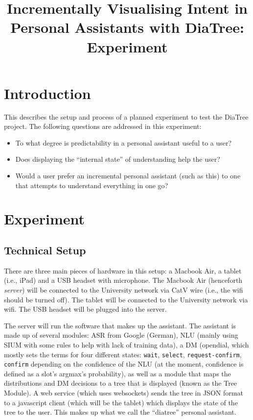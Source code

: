 \documentclass[a4paper,10pt]{article}
\title{Incrementally Visualising Intent in Personal Assistants with DiaTree: Experiment}
\author{}
\begin{document}
\maketitle

\begin{abstract}

\end{abstract}

\section{Introduction}

This describes the setup and process of a planned experiment to test the DiaTree project. The following questions are addressed in this experiment:

\begin{itemize}
 \item To what degree is predictability in a personal assistant useful to a user?
 \item Does displaying the ``internal state'' of understanding help the user?
 \item Would a user prefer an incremental personal assistant (such as this) to one that attempts to understand everything in one go?
\end{itemize}


\section{Experiment}

\subsection{Technical Setup}

There are three main pieces of hardware in this setup: a Macbook Air, a tablet (i.e., iPad) and a USB headset with microphone. The Macbook Air (henceforth \emph{server}) will be connected to the University network via CatV wire (i.e., the wifi should be turned off). The tablet will be connected to the University network via wifi. The USB headset will be plugged into the server. 

The server will run the software that makes up the assistant. The assistant is made up of several modules: ASR from Google (German), NLU (mainly using SIUM with some rules to help with lack of training data), a DM (opendial, which mostly sets the terms for four different states: \texttt{wait}, \texttt{select}, \texttt{request-confirm}, \texttt{confirm} depending on the confidence of the NLU (at the moment, confidence is defined as a slot's argmax's probability), as well as a module that maps the distributions and DM decisions to a tree that is displayed (known as the Tree Module). A web service (which uses websockets) sends the tree in JSON format to a javascript client (which will be the tablet) which displays the state of the tree to the user. This makes up what we call the ``diatree'' personal assistant. 
\end{document}
